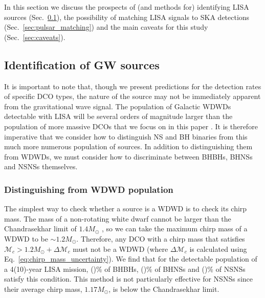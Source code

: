In this section we discuss the prospects of (and methods for) identifying LISA sources (Sec.~\ref{sec:identify_sources}), the possibility of matching LISA signals to SKA detections (Sec.~\ref{sec:pulsar_matching}) and the main caveats for this study (Sec.~\ref{sec:caveats}).

\subsection{Identification of GW sources}\label{sec:identify_sources}
It is important to note that, though we present predictions for the detection rates of specific DCO types, the nature of the source may not be immediately apparent from the gravitational wave signal. The population of Galactic WDWDs detectable with LISA will be several orders of magnitude larger than the population of more massive DCOs that we focus on in this paper \citep[e.g.][]{Korol+2017}. It is therefore imperative that we consider how to distinguish NS and BH binaries from this much more numerous population of sources. In addition to distinguishing them from WDWDs, we must consider how to discriminate between BHBHs, BHNSs and NSNSs themselves.

\subsubsection{Distinguishing from WDWD population}\label{sec:WDWD_distinguish}
The simplest way to check whether a source is a WDWD is to check its chirp mass. The mass of a non-rotating white dwarf cannot be larger than the Chandrasekhar limit of $1.4 \unit{M_\odot}$ \citep{Chandrasekhar+1931, Hamada+1961}, so we can take the maximum chirp mass of a WDWD to be $\sim 1.2 \unit{M_{\odot}}$. Therefore, any DCO with a chirp mass that satisfies $\mathcal{M}_c > 1.2 \unit{M_{\odot}} + \Delta \mathcal{M}_c$ must not be a WDWD (where $\Delta \mathcal{M}_c$ is calculated using Eq.~\ref{eq:chirp_mass_uncertainty}). We find that for the detectable population of a 4(10)-year LISA mission, \BHBHAboveMaxWDWDFourPerc{}(\BHBHAboveMaxWDWDTenPerc{})\% of BHBHs, \BHNSAboveMaxWDWDFourPerc{}(\BHNSAboveMaxWDWDTenPerc{})\% of BHNSs and \NSNSAboveMaxWDWDFourPerc{}(\NSNSAboveMaxWDWDTenPerc{})\% of NSNSs satisfy this condition. This method is not particularly effective for NSNSs since their average chirp mass, $1.17 \unit{M_\odot}$, is below the Chandrasekhar limit.

